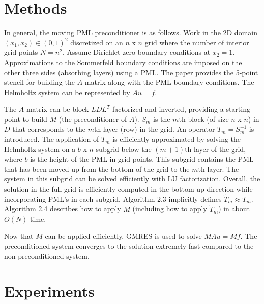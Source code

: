 \documentclass[11pt]{article}
\begin{document}
\section{Methods}
In general, the moving PML preconditioner is as follows.
Work in the 2D domain $(x_1, x_2) \in (0,1)^2$ discretized on an $n$ x $n$ grid where the number 
of interior grid points $N=n^2$. 
Assume Dirichlet zero boundary conditions at $x_2=1$. Approximations to the Sommerfeld 
boundary conditions are imposed on the other three sides (absorbing layers) using a PML. 
The paper provides the 5-point stencil for building the $A$ matrix along with the
PML boundary conditions. The Helmholtz system can be represented by $Au=f$.

The $A$ matrix can be block-$LDL^T$ factorized and inverted, providing a starting point to 
build $M$ (the preconditioner of $A$).
$S_m$ is the $m$th block (of size $n$ x $n$) in $D$ that corresponds to the $m$th layer (row) in the grid. 
An operator $T_m=S_m^{-1}$ is introduced. The application of $T_m$ 
is efficiently approximated by solving the Helmholtz system on a $b$ x $n$ subgrid below the $(m+1)$th layer
of the grid, where $b$ is the height of the PML in grid points. This subgrid contains the 
PML that has been moved up from the bottom of the grid to the $m$th layer. The system
in this subgrid can be solved efficiently with LU factorization. Overall, the solution
in the full grid is efficiently computed in the bottom-up direction while incorporating 
PML's in each subgrid. Algorithm 2.3 implicitly defines $\tilde{T}_m \approx T_m$. 
Algorithm 2.4 describes how to apply $M$ (including how to apply $\tilde{T}_m$) in about $O(N)$ time. 

Now that $M$ can be applied efficiently, GMRES is used to solve $MAu=Mf$. The preconditioned system
converges to the solution extremely fast compared to the non-preconditioned system.

\section{Experiments}
\end{document}
